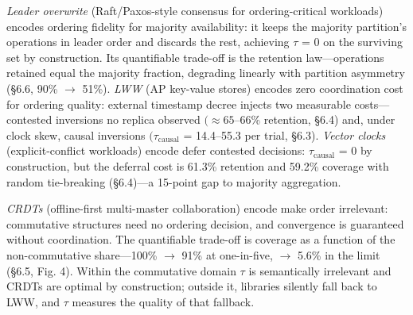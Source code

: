 \documentclass[11pt]{article}
\begin{document}
\begin{table}[t]
\centering
\caption{Table 3. Reconciliation strategies characterized by how they manage pairwise inversions.}
\label{tbl:3}
\end{table}

\emph{Leader overwrite} (Raft/Paxos-style consensus for ordering-critical workloads) encodes ordering fidelity for majority availability: it keeps the majority partition's operations in leader order and discards the rest, achieving $\tau $ = 0 on the surviving set by construction. Its quantifiable trade-off is the retention law—operations retained equal the majority fraction, degrading linearly with partition asymmetry (§6.6, 90\% $\rightarrow $ 51\%). \emph{LWW} (AP key-value stores) encodes zero coordination cost for ordering quality: external timestamp decree injects two measurable costs—contested inversions no replica observed $(\approx 65$–66\% retention, §6.4) and, under clock skew, causal inversions $(\tau _{\mathrm{causal}}$ = 14.4–55.3 per trial, §6.3). \emph{Vector clocks} (explicit-conflict workloads) encode defer contested decisions: $\tau _{\mathrm{causal}}$ = 0 by construction, but the deferral cost is 61.3\% retention and 59.2\% coverage with random tie-breaking (§6.4)—a 15-point gap to majority aggregation.

\emph{CRDTs} (offline-first multi-master collaboration) encode make order irrelevant: commutative structures need no ordering decision, and convergence is guaranteed without coordination. The quantifiable trade-off is coverage as a function of the non-commutative share—100\% $\rightarrow $ 91\% at one-in-five, $\rightarrow $ 5.6\% in the limit (§6.5, Fig. 4). Within the commutative domain $\tau $ is semantically irrelevant and CRDTs are optimal by construction; outside it, libraries silently fall back to LWW, and $\tau $ measures the quality of that fallback.
\end{document}
